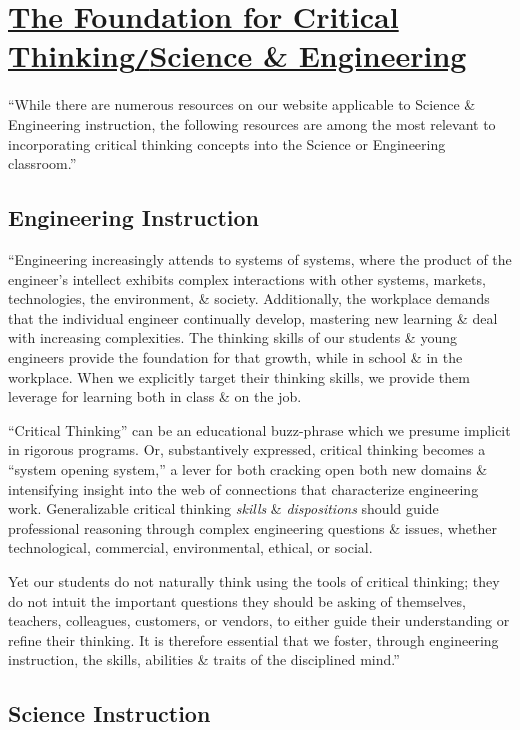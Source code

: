 \documentclass[oneside]{book}
\numberwithin{equation}{section}
\begin{document}
\section{\href{https://www.criticalthinking.org/pages/science-and-engineering/803}{The Foundation for Critical Thinking\texttt{/}Science \& Engineering}}
``While there are numerous resources on our website applicable to Science \& Engineering instruction, the following resources are among the most relevant to incorporating critical thinking concepts into the Science or Engineering classroom.''

\subsection{Engineering Instruction}
``Engineering increasingly attends to systems of systems, where the product of the engineer's intellect exhibits complex interactions with other systems, markets, technologies, the environment, \& society. Additionally, the workplace demands that the individual engineer continually develop, mastering new learning \& deal with increasing complexities. The thinking skills of our students \& young engineers provide the foundation for that growth, while in school \& in the workplace. When we explicitly target their thinking skills, we provide them leverage for learning both in class \& on the job.

``Critical Thinking'' can be an educational buzz-phrase which we presume implicit in rigorous programs. Or, substantively expressed, critical thinking becomes a ``system opening system,'' a lever for both cracking open both new domains \& intensifying insight into the web of connections that characterize engineering work. Generalizable critical thinking \textit{skills} \& \textit{dispositions} should guide professional reasoning through complex engineering questions \& issues, whether technological, commercial, environmental, ethical, or social.

Yet our students do not naturally think using the tools of critical thinking; they do not intuit the important questions they should be asking of themselves, teachers, colleagues, customers, or vendors, to either guide their understanding or refine their thinking. It is therefore essential that we foster, through engineering instruction, the skills, abilities \& traits of the disciplined mind.''

\subsection{Science Instruction}
\end{document}
